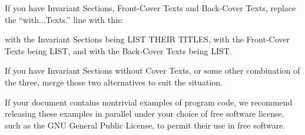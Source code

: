 \documentclass[10pt,a4paper,titlepage,twoside,openright]{report}
\begin{document}
If you have Invariant Sections, Front-Cover Texts and Back-Cover Texts,
replace the ``with...Texts.'' line with this:

    with the Invariant Sections being LIST THEIR TITLES, with the
    Front-Cover Texts being LIST, and with the Back-Cover Texts being LIST.

If you have Invariant Sections without Cover Texts, or some other
combination of the three, merge those two alternatives to suit the
situation.

If your document contains nontrivial examples of program code, we
recommend releasing these examples in parallel under your choice of
free software license, such as the GNU General Public License,
to permit their use in free software.
\end{document}
